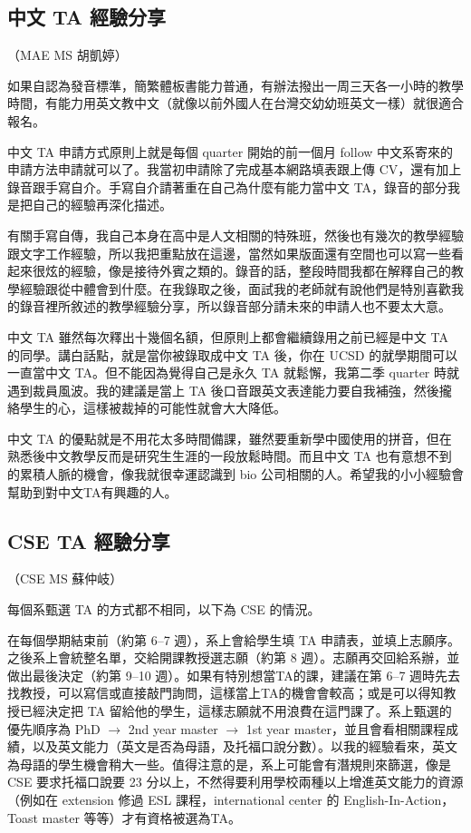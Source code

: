 \documentclass[10pt,a4paper]{book}
\begin{document}
\begin{CJK}{UTF8}{bkai}
\subsection{中文 TA 經驗分享}
（MAE MS 胡凱婷）

如果自認為發音標準，簡繁體板書能力普通，有辦法撥出一周三天各一小時的教學時間，有能力用英文教中文（就像以前外國人在台灣交幼幼班英文一樣）就很適合報名。

中文 TA 申請方式原則上就是每個 quarter 開始的前一個月 follow 中文系寄來的申請方法申請就可以了。我當初申請除了完成基本網路填表跟上傳 CV，還有加上錄音跟手寫自介。手寫自介請著重在自己為什麼有能力當中文 TA，錄音的部分我是把自己的經驗再深化描述。

有關手寫自傳，我自己本身在高中是人文相關的特殊班，然後也有幾次的教學經驗跟文字工作經驗，所以我把重點放在這邊，當然如果版面還有空間也可以寫一些看起來很炫的經驗，像是接待外賓之類的。錄音的話，整段時間我都在解釋自己的教學經驗跟從中體會到什麼。在我錄取之後，面試我的老師就有說他們是特別喜歡我的錄音裡所敘述的教學經驗分享，所以錄音部分請未來的申請人也不要太大意。

中文 TA 雖然每次釋出十幾個名額，但原則上都會繼續錄用之前已經是中文 TA 的同學。講白話點，就是當你被錄取成中文 TA 後，你在 UCSD 的就學期間可以一直當中文 TA。但不能因為覺得自己是永久 TA 就鬆懈，我第二季 quarter 時就遇到裁員風波。我的建議是當上 TA 後口音跟英文表達能力要自我補強，然後攏絡學生的心，這樣被裁掉的可能性就會大大降低。

中文 TA 的優點就是不用花太多時間備課，雖然要重新學中國使用的拼音，但在熟悉後中文教學反而是研究生生涯的一段放鬆時間。而且中文 TA 也有意想不到的累積人脈的機會，像我就很幸運認識到 bio 公司相關的人。希望我的小小經驗會幫助到對中文TA有興趣的人。

\subsection{CSE TA 經驗分享}
（CSE MS 蘇仲岐）

每個系甄選 TA 的方式都不相同，以下為 CSE 的情況。

在每個學期結束前（約第 6--7 週），系上會給學生填 TA 申請表，並填上志願序。之後系上會統整名單，交給開課教授選志願（約第 8 週）。志願再交回給系辦，並做出最後決定（約第 9--10 週）。如果有特別想當TA的課，建議在第 6--7 週時先去找教授，可以寫信或直接敲門詢問，這樣當上TA的機會會較高；或是可以得知教授已經決定把 TA 留給他的學生，這樣志願就不用浪費在這門課了。系上甄選的優先順序為 PhD $\rightarrow$ 2nd year master $\rightarrow$ 1st year master，並且會看相關課程成績，以及英文能力（英文是否為母語，及托福口說分數）。以我的經驗看來，英文為母語的學生機會稍大一些。值得注意的是，系上可能會有潛規則來篩選，像是 CSE 要求托福口說要 23 分以上，不然得要利用學校兩種以上增進英文能力的資源（例如在 extension 修過 ESL 課程，international center 的 English-In-Action，Toast master 等等）才有資格被選為TA。


\end{CJK}
\end{document}
